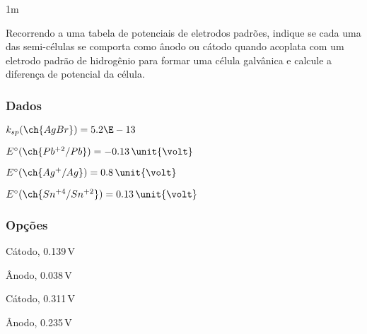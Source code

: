 \begin{questionBox}1m{}
    
    Recorrendo a uma tabela de potenciais de eletrodos padrões, indique se cada uma das semi-células se comporta como ânodo ou cátodo quando acoplata com um eletrodo padrão de hidrogênio para formar uma célula galvânica e calcule a diferença de potencial da célula.

    \subsubsection*{Dados}
    \begin{itemize}
        \begin{multicols}{2}
            \item \(k_{sp} (\ch{AgBr}) = 5.2\E-13\)
            \item \(E^\circ (\ch{Pb^{+2}/Pb})     = -0.13\,\unit{\volt}\)
            \item \(E^\circ (\ch{Ag^{+ }/Ag})     =  0.8 \,\unit{\volt}\)
            \item \(E^\circ (\ch{Sn^{+4}/Sn^{+2}})=  0.13\,\unit{\volt}\)
        \end{multicols}
    \end{itemize}

    \subsubsection*{Opções}
    \begin{itemize}
        \begin{multicols}{2}
            \item Cátodo, 0.139\,\unit{\volt}
            \item Ânodo,  0.038\,\unit{\volt}
            \item Cátodo, 0.311\,\unit{\volt}
            \item Ânodo,  0.235\,\unit{\volt}
        \end{multicols}
    \end{itemize}

            
            
            

\end{questionBox}
